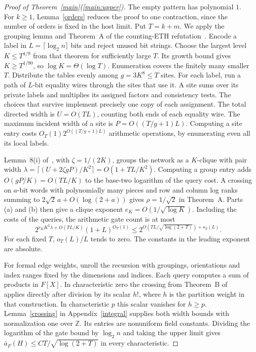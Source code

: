 \documentclass[11pt]{article}
\theoremstyle{remark}
\begin{document}
\begin{proof}[Proof of Theorem~\ref{main}(\ref{main:upper})]
The empty pattern has polynomial $1$. For $k\ge1$, Lemma~\ref{orders} reduces the proof to one contraction, since the number of orders is fixed in the host limit. Put $T=k+m$. We apply the grouping lemma and Theorem~A of the counting-ETH refutation~\cite{grid-sat}. Encode a label in $L=\lceil\log_2 n\rceil$ bits and reject unused bit strings. Choose the largest level $K\le T^{1/9}$ from that theorem for sufficiently large $T$. Its growth bound gives $K\ge T^{1/90}$, so $\log K=\Theta(\log T)$. Enumeration covers the finitely many smaller $T$. Distribute the tables evenly among $g=3K^8\le T$ sites. For each label, run a path of $L$-bit equality wires through the sites that use it. A site sums over its private labels and multiplies its assigned factors and consistency tests. The choices that survive implement precisely one copy of each assignment. The total directed width is $U=O(TL)$, counting both ends of each equality wire. The maximum incident width of a site is $P=O((T/g+1)L)$. Computing a site entry costs $O_T(1)2^{O((T/g+1)L)}$ arithmetic operations, by enumerating even all its local labels.

Lemma~8(i) of~\cite{grid-sat}, with $\zeta=1/(2K)$, groups the network as a $K$-clique with pair width $\lambda=\lceil(U+2\zeta gP)/K^2\rceil=O(1+TL/K^2)$. Computing a group entry adds $O(gP/K)=O(TL/K)$ to the base-two logarithm of the query cost. A crossing on $a$-bit words with polynomially many pieces and row and column log ranks summing to $2\sqrt2\,a+O(\log(2+a))$ gives $\rho=1/\sqrt2$ in Theorem~A. Parts (a) and (b) then give a clique exponent $e_K=O(1/\sqrt{\log K})$. Including the costs of the queries, the arithmetic gate count is at most
\[
 2^{e_K K^2\lambda+O(TL/K)}(1+L)^{O_T(1)}
   \le 2^{O(TL/\sqrt{\log(2+T)})+o_T(L)} .
\]
For each fixed $T$, $o_T(L)/L$ tends to zero. The constants in the leading exponent are absolute.

For formal edge weights, unroll the recursion with groupings, orientations and index ranges fixed by the dimensions and indices. Each query computes a sum of products in $F[X]$. In characteristic zero the crossing from Theorem~B of~\cite{grid-sat} applies directly after division by its scalar $h!$, where $h$ is the partition weight in that construction. In characteristic $p$ this scalar vanishes for $h\ge p$. Lemma~\ref{crossing} in Appendix~\ref{integral} supplies both width bounds with normalization one over $\mathbb Z$. Its entries are nonuniform field constants. Dividing the logarithm of the gate bound by $\log_2 n$ and taking the upper limit gives $\bar a_F(H)\le CT/\sqrt{\log(2+T)}$ in every characteristic.
\end{proof}
\end{document}
